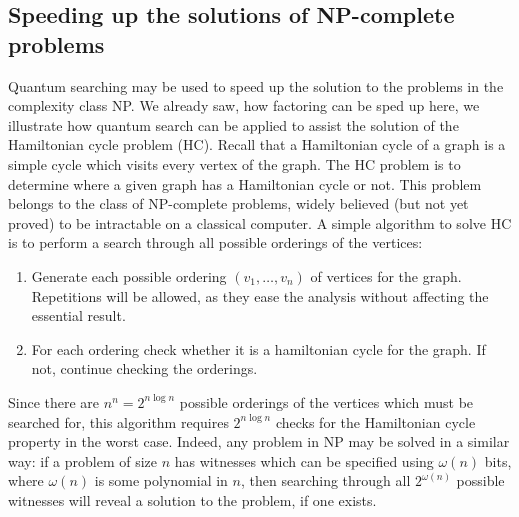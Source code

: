 \subsection{Speeding up the solutions of NP-complete problems}
Quantum searching may be used to speed up the solution to the problems in the complexity class NP. We already saw, how factoring can be sped up here, we illustrate how quantum search can be applied to assist the solution of the Hamiltonian cycle problem (HC). Recall that a Hamiltonian cycle of a graph is a simple cycle which visits every vertex of the graph. The HC problem is to determine where a given graph has a Hamiltonian cycle or not. This problem belongs to the class of NP-complete problems, widely believed (but not yet proved) to be intractable on a classical computer. A simple algorithm to solve HC is to perform a search through all possible orderings of the vertices:
\begin{enumerate}
    \item Generate each possible ordering $(v_1,\ldots, v_n)$ of vertices for the graph. Repetitions will be allowed, as they ease the analysis without affecting the essential result.
\item For each ordering check whether it is a hamiltonian cycle for the graph. If not, continue checking the orderings.
\end{enumerate}
Since there are $n^n=2^{n\log n}$ possible orderings of the vertices which must be searched for, this algorithm requires $2^{n\log n}$ checks for the Hamiltonian cycle property in the worst case. Indeed, any problem in NP may be solved in a similar way: if a problem of size $n$ has witnesses which can be specified using $\omega(n)$ bits, where $\omega(n)$ is some polynomial in $n$, then searching through all $2^{\omega(n)}$ possible witnesses will reveal a solution to the problem, if one exists.

